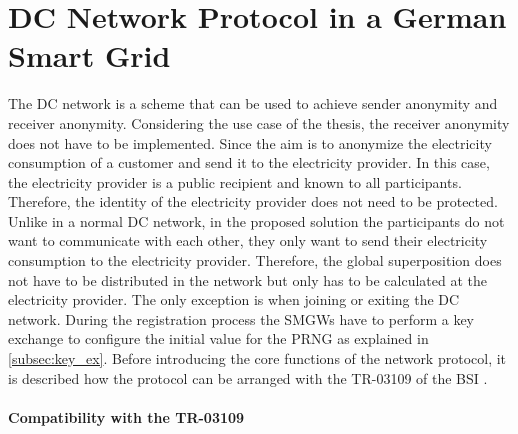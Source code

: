 \section{DC Network Protocol in a German Smart Grid}
The DC network is a scheme that can be used to achieve sender anonymity and receiver anonymity. Considering the use case of the thesis, the receiver anonymity does not have to be implemented. Since the aim is to anonymize the electricity consumption of a customer and send it to the electricity provider. In this case, the electricity provider is a public recipient and known to all participants. Therefore, the identity of the electricity provider does not need to be protected. Unlike in a normal DC network, in the proposed solution the participants do not want to communicate with each other, they only want to send their electricity consumption to the electricity provider. Therefore, the global superposition does not have to be distributed in the network but only has to be calculated at the electricity provider. The only exception is when joining or exiting the DC network.
During the registration process the \gls{SMGW}s have to perform a key exchange to configure the initial value for the \gls{PRNG} as explained in \ref{subsec:key_ex}. Before introducing the core functions of the network protocol, it is described how the protocol can be arranged with the \gls{TR-03109} of the \gls{BSI} \cite{TR-031}.\\
\\
\textbf{Compatibility with the TR-03109}
\\
\\
